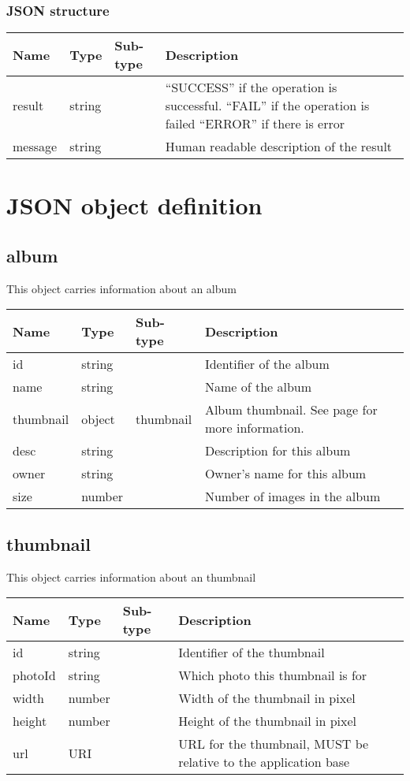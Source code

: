 \documentclass[a4paper,12pt]{report}
\newcommand{\see}[1]{See page \pageref{#1} for more information.}
\begin{document}
	\subsection{JSON structure}
	\begin{tabular}{|l|l|l|p{10cm}|}
		\hline
		Name & Type & Sub-type & Description\\\hline
		result & string & & ``SUCCESS'' if the operation is successful.\newline
		``FAIL'' if the operation is failed\newline
		``ERROR'' if there is error\\\hline
		message & string & & Human readable description of the result\\\hline
	\end{tabular}
	
	
	\chapter{JSON object definition}
	\section{album}\label{obj:album}
	This object carries information about an album
	
	\begin{tabular}{|l|l|l|p{10cm}|}
		\hline
		Name & Type & Sub-type & Description\\\hline
		id & string & & Identifier of the album\\\hline
		name & string & & Name of the album\\\hline
		thumbnail & object & thumbnail & Album thumbnail. \see{obj:thumbnail}\\\hline
		desc & string & & Description for this album\\\hline
		owner & string & & Owner's name for this album\\\hline
		size& number & & Number of images in the album\\\hline
	\end{tabular}
	\section{thumbnail}\label{obj:thumbnail}
	This object carries information about an thumbnail
	
	\begin{tabular}{|l|l|l|p{10cm}|}
		\hline
		Name & Type & Sub-type & Description\\\hline
		id & string & & Identifier of the thumbnail\\\hline
		photoId & string & & Which photo this thumbnail is for\\\hline
		width & number & & Width of the thumbnail in pixel\\\hline
		height & number & & Height of the thumbnail in pixel\\\hline
		url & URI & & URL for the thumbnail, MUST be relative to the application base\\\hline
	\end{tabular}
\end{document}
